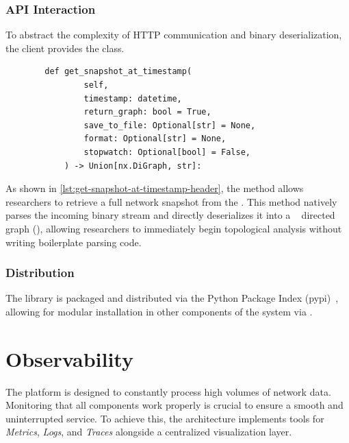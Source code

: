 \subsubsection{API Interaction}
To abstract the complexity of HTTP communication and binary deserialization, 
the client provides the  class.

\begin{listing}[htbp]
    \begin{verbatim}
        def get_snapshot_at_timestamp(
                self,
                timestamp: datetime,
                return_graph: bool = True,
                save_to_file: Optional[str] = None,
                format: Optional[str] = None,
                stopwatch: Optional[bool] = False,
            ) -> Union[nx.DiGraph, str]:
    \end{verbatim}
    \caption{
        Method definition for retrieving historic network snapshots. 
        The method supports direct deserialization into graph structures for immediate topological analysis~\cite[./LnHistoryRequester.py]{kraus_lnhistorypythonclient_2026}.
    }
    \label{lst:get-snapshot-at-timestamp-header}
\end{listing}

As shown in \autoref{lst:get-snapshot-at-timestamp-header}, the  method 
allows researchers to retrieve a full network snapshot from the .
This method natively parses the incoming binary stream and directly deserializes it into a 
~\cite{hagberg_exploring_2008} directed graph (), 
allowing researchers to immediately begin topological analysis without writing boilerplate parsing code.

\subsubsection{Distribution}
The library is packaged and distributed via the Python Package Index (\gls{pypi})~\cite{pythonpackagingauthority_pip_2024}, 
allowing for modular installation in other components of the system via .


\section{Observability}
\label{sec:observability}

The  platform is designed to constantly process high volumes of network data. 
Monitoring that all components work properly is crucial to ensure a smooth and uninterrupted service. 
To achieve this, the architecture implements tools for \textit{Metrics}, \textit{Logs}, and \textit{Traces} alongside a centralized visualization layer.

